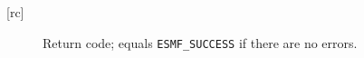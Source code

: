 \begin{description}
     \item [{[rc]}]
       Return code; equals {\tt ESMF\_SUCCESS} if there are no errors.
     \end{description}
  
\setlength{\parskip}{\oldparskip}
\setlength{\parindent}{\oldparindent}
\setlength{\baselineskip}{\oldbaselineskip}
